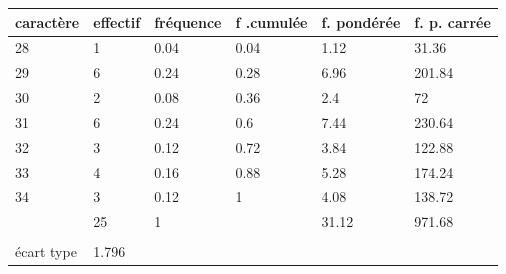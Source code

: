 \documentclass[12pt, addpoints]{exam}
\begin{document}
\begin{questions}
\begin{solution}
\begin{enumerate}[1.]
            \begin{tabular}{llllll}
\hline
\multicolumn{1}{|l|}{caractère} & \multicolumn{1}{l|}{effectif} & \multicolumn{1}{l|}{fréquence} & \multicolumn{1}{l|}{f .cumulée} & \multicolumn{1}{l|}{f. pondérée} & \multicolumn{1}{l|}{f. p. carrée} \\ \hline
\multicolumn{1}{|l|}{28}        & \multicolumn{1}{l|}{1}        & \multicolumn{1}{l|}{0.04}      & \multicolumn{1}{l|}{0.04}       & \multicolumn{1}{l|}{1.12}        & \multicolumn{1}{l|}{31.36}        \\ \hline
\multicolumn{1}{|l|}{29}        & \multicolumn{1}{l|}{6}        & \multicolumn{1}{l|}{0.24}      & \multicolumn{1}{l|}{0.28}       & \multicolumn{1}{l|}{6.96}        & \multicolumn{1}{l|}{201.84}       \\ \hline
\multicolumn{1}{|l|}{30}        & \multicolumn{1}{l|}{2}        & \multicolumn{1}{l|}{0.08}      & \multicolumn{1}{l|}{0.36}       & \multicolumn{1}{l|}{2.4}         & \multicolumn{1}{l|}{72}           \\ \hline
\multicolumn{1}{|l|}{31}        & \multicolumn{1}{l|}{6}        & \multicolumn{1}{l|}{0.24}      & \multicolumn{1}{l|}{0.6}        & \multicolumn{1}{l|}{7.44}        & \multicolumn{1}{l|}{230.64}       \\ \hline
\multicolumn{1}{|l|}{32}        & \multicolumn{1}{l|}{3}        & \multicolumn{1}{l|}{0.12}      & \multicolumn{1}{l|}{0.72}       & \multicolumn{1}{l|}{3.84}        & \multicolumn{1}{l|}{122.88}       \\ \hline
\multicolumn{1}{|l|}{33}        & \multicolumn{1}{l|}{4}        & \multicolumn{1}{l|}{0.16}      & \multicolumn{1}{l|}{0.88}       & \multicolumn{1}{l|}{5.28}        & \multicolumn{1}{l|}{174.24}       \\ \hline
\multicolumn{1}{|l|}{34}        & \multicolumn{1}{l|}{3}        & \multicolumn{1}{l|}{0.12}      & \multicolumn{1}{l|}{1}          & \multicolumn{1}{l|}{4.08}        & \multicolumn{1}{l|}{138.72}       \\ \hline
\multicolumn{1}{|l|}{}          & \multicolumn{1}{l|}{25}       & \multicolumn{1}{l|}{1}         & \multicolumn{1}{l|}{}           & \multicolumn{1}{l|}{31.12}       & \multicolumn{1}{l|}{971.68}       \\ \hline
                                &                               &                                &                                 &                                  &                                   \\
écart type                      & 1.796                    &                                &                                 &                                  &                                  
\end{tabular}


\end{enumerate}
\end{solution}
\end{questions}
\end{document}
